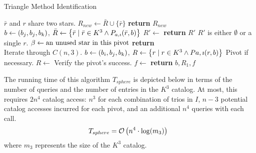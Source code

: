 \begin{algorithm}[ht]
    \caption{Triangle Method Identification} \label{algorithm:triangleIdentification}
    \begin{algorithmic}[1]
        \LineComment $\bar{r}$ and $r$ share two stars.
        \State $R_{new} \gets \bar{R} \cup \{\bar{r}\}$
        \EndIf
        \EndFor
        \State \textbf{return} $R_{new}$
        \EndFunction
        \\
        \State $b \gets (b_j, b_j, b_k)$, $\bar{R} \gets \left\{  \bar{r} \mid \bar{r} \in K^3
        \land P_{a, \imath}(\bar{r}, b)  \right\}$
        \State $R' \gets $ 
        \State \textbf{return} $R'$ \Comment $R'$ is either $\emptyset$ or a single $r$.
        \Else
        \State $\beta \gets \text{an unused star in this pivot}$
        \State \textbf{return} 
        \EndIf
        \EndFunction
        \\
          \Comment Iterate through $C(n, 3)$.
        \State $b \gets \left(b_i, b_j, b_k\right)$, $R \gets \left\{  r \mid r \in K^3
        \land P{a, \imath}(r, b)  \right\}$
         \Comment Pivot if necessary.
        \State $R \gets $ 
        \EndIf
         \Comment Verify the pivot's success.
        \State $f \gets $ 
        \invalidBijection
        \State \textbf{return} $b, R_1, f$
        \EndIf
        \EndIf
        \EndFor
        \EndFor
        \EndFor
        \EndFunction
    \end{algorithmic}
\end{algorithm}

The running time of this algorithm $T_{sphere}$ is depicted below in terms of the number of queries and the number of
entries in the $K^3$ catalog.
At most, this requires $2n^4$ catalog access: $n^3$ for each combination of trios in $I$, $n - 3$ potential catalog
accesses incurred for each pivot, and an additional $n^4$ queries with each  call.
\begin{equation}\label{eq:sphereComplexity}
    T_{sphere} = \bigO\left( n^4 \cdot \log (m_3) \right)
\end{equation}
where $m_3$ represents the size of the $K^3$ catalog.

